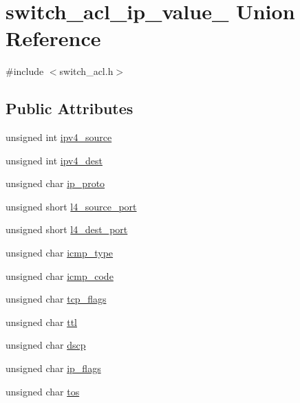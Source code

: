 \hypertarget{unionswitch__acl__ip__value__}{\section{switch\+\_\+acl\+\_\+ip\+\_\+value\+\_\+ Union Reference}
\label{unionswitch__acl__ip__value__}
}


{\ttfamily \#include $<$switch\+\_\+acl.\+h$>$}

\subsection*{Public Attributes}
\begin{DoxyCompactItemize}
\item 
unsigned int \hyperlink{unionswitch__acl__ip__value___ac657286d9079c7286ebb71ee289d7ab3}{ipv4\+\_\+source}
\item 
unsigned int \hyperlink{unionswitch__acl__ip__value___a674522d0fc324f1e079f70ce37eac1fb}{ipv4\+\_\+dest}
\item 
unsigned char \hyperlink{unionswitch__acl__ip__value___ae162f1414874cd03f57b722ca1acb8e9}{ip\+\_\+proto}
\item 
unsigned short \hyperlink{unionswitch__acl__ip__value___aaa5556a5b1d57fdcfb9f77925f625aa3}{l4\+\_\+source\+\_\+port}
\item 
unsigned short \hyperlink{unionswitch__acl__ip__value___a0268da45a9c739a38f8445dd32a70a88}{l4\+\_\+dest\+\_\+port}
\item 
unsigned char \hyperlink{unionswitch__acl__ip__value___a9b8e3f43be975d5377dc8825f6a9ebaf}{icmp\+\_\+type}
\item 
unsigned char \hyperlink{unionswitch__acl__ip__value___a6d310c1f72cf97ca30cd549785650424}{icmp\+\_\+code}
\item 
unsigned char \hyperlink{unionswitch__acl__ip__value___ab9e787b75fb06987f57a88abbf76f466}{tcp\+\_\+flags}
\item 
unsigned char \hyperlink{unionswitch__acl__ip__value___a06a2e13b9ea59e563ef4f690ac8fd5c1}{ttl}
\item 
unsigned char \hyperlink{unionswitch__acl__ip__value___a12422002b0ded28763363a1eb4c300a1}{dscp}
\item 
unsigned char \hyperlink{unionswitch__acl__ip__value___a55d25ebd3582c35250ffd173fbebb0f3}{ip\+\_\+flags}
\item 
unsigned char \hyperlink{unionswitch__acl__ip__value___ab4432857f0438d287379aba3016f8bdb}{tos}

\end{DoxyCompactItemize}

